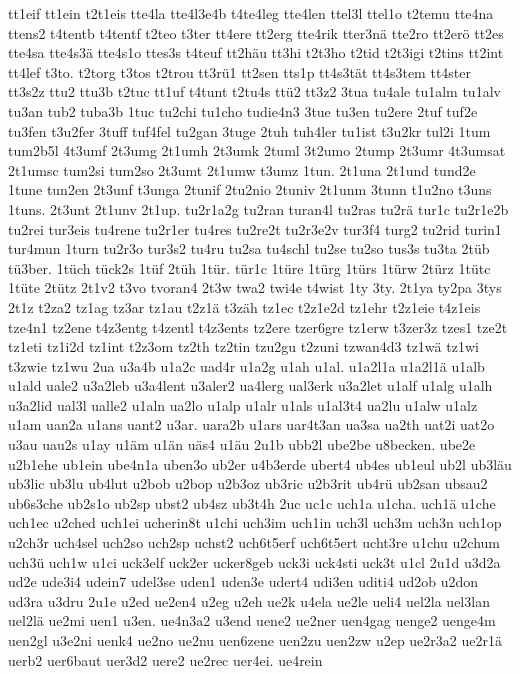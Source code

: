 {tt1eif
tt1ein
t2t1eis
tte4la
tte4l3e4b
t4te4leg
tte4len
ttel3l
ttel1o
t2temu
tte4na
ttens2
t4tentb
t4tentf
t2teo
t3ter
tt4ere
tt2erg
tte4rik
tter3nä
tte2ro
tt2erö
tt2es
tte4sa
tte4s3ä
tte4s1o
ttes3s
t4teuf
tt2häu
tt3hi
t2t3ho
t2tid
t2t3igi
t2tins
tt2int
tt4lef
t3to.
t2torg
t3tos
t2trou
tt3rü1
tt2sen
tts1p
tt4s3tät
tt4s3tem
tt4ster
tt3s2z
ttu2
ttu3b
t2tuc
tt1uf
t4tunt
t2tu4s
ttü2
tt3z2
3tua
tu4ale
tu1alm
tu1alv
tu3an
tub2
tuba3b
1tuc
tu2chi
tu1cho
tudie4n3
3tue
tu3en
tu2ere
2tuf
tuf2e
tu3fen
t3u2fer
3tuff
tuf4fel
tu2gan
3tuge
2tuh
tuh4ler
tu1ist
t3u2kr
tul2i
1tum
tum2b5l
4t3umf
2t3umg
2t1umh
2t3umk
2tuml
3t2umo
2tump
2t3umr
4t3umsat
2t1umsc
tum2si
tum2so
2t3umt
2t1umw
t3umz
1tun.
2t1una
2t1und
tund2e
1tune
tun2en
2t3unf
t3unga
2tunif
2tu2nio
2tuniv
2t1unm
3tunn
t1u2no
t3uns
1tuns.
2t3unt
2t1unv
2t1up.
tu2r1a2g
tu2ran
turan4l
tu2ras
tu2rä
tur1c
tu2r1e2b
tu2rei
tur3eis
tu4rene
tu2r1er
tu4res
tu2re2t
tu2r3e2v
tur3f4
turg2
tu2rid
turin1
tur4mun
1turn
tu2r3o
tur3s2
tu4ru
tu2sa
tu4schl
tu2se
tu2so
tus3s
tu3ta
2tüb
tü3ber.
1tüch
tück2s
1tüf
2tüh
1tür.
tür1c
1türe
1türg
1türs
1türw
2türz
1tütc
1tüte
2tütz
2t1v2
t3vo
tvoran4
2t3w
twa2
twi4e
t4wist
1ty
3ty.
2t1ya
ty2pa
3tys
2t1z
t2za2
tz1ag
tz3ar
tz1au
t2z1ä
t3zäh
tz1ec
t2z1e2d
tz1ehr
t2z1eie
t4z1eis
tze4n1
tz2ene
t4z3entg
t4zentl
t4z3ents
tz2ere
tzer6gre
tz1erw
t3zer3z
tzes1
tze2t
tz1eti
tz1i2d
tz1int
t2z3om
tz2th
tz2tin
tzu2gu
t2zuni
tzwan4d3
tz1wä
tz1wi
t3zwie
tz1wu
2ua
u3a4b
u1a2c
uad4r
u1a2g
u1ah
u1al.
u1a2l1a
u1a2l1ä
u1alb
u1ald
uale2
u3a2leb
u3a4lent
u3aler2
ua4lerg
ual3erk
u3a2let
u1alf
u1alg
u1alh
u3a2lid
ual3l
ualle2
u1aln
ua2lo
u1alp
u1alr
u1als
u1al3t4
ua2lu
u1alw
u1alz
u1am
uan2a
u1ans
uant2
u3ar.
uara2b
u1ars
uar4t3an
ua3sa
ua2th
uat2i
uat2o
u3au
uau2s
u1ay
u1äm
u1än
uäs4
u1äu
2u1b
ubb2l
ube2be
u8becken.
ube2e
u2b1ehe
ub1ein
ube4n1a
uben3o
ub2er
u4b3erde
ubert4
ub4es
ub1eul
ub2l
ub3läu
ub3lic
ub3lu
ub4lut
u2bob
u2bop
u2b3oz
ub3ric
u2b3rit
ub4rü
ub2san
ubsau2
ub6s3che
ub2s1o
ub2sp
ubst2
ub4sz
ub3t4h
2uc
uc1c
uch1a
u1cha.
uch1ä
u1che
uch1ec
u2ched
uch1ei
ucherin8t
u1chi
uch3im
uch1in
uch3l
uch3m
uch3n
uch1op
u2ch3r
uch4sel
uch2so
uch2sp
uchst2
uch6t5erf
uch6t5ert
ucht3re
u1chu
u2chum
uch3ü
uch1w
u1ci
uck3elf
uck2er
ucker8geb
uck3i
uck4sti
uck3t
u1cl
2u1d
u3d2a
ud2e
ude3i4
udein7
udel3se
uden1
uden3e
udert4
udi3en
uditi4
ud2ob
u2don
ud3ra
u3dru
2u1e
u2ed
ue2en4
u2eg
u2eh
ue2k
u4ela
ue2le
ueli4
uel2la
uel3lan
uel2lä
ue2mi
uen1
u3en.
ue4n3a2
u3end
uene2
ue2ner
uen4gag
uenge2
uenge4m
uen2gl
u3e2ni
uenk4
ue2no
ue2nu
uen6zene
uen2zu
uen2zw
u2ep
ue2r3a2
ue2r1ä
uerb2
uer6baut
uer3d2
uere2
ue2rec
uer4ei.
ue4rein
}
